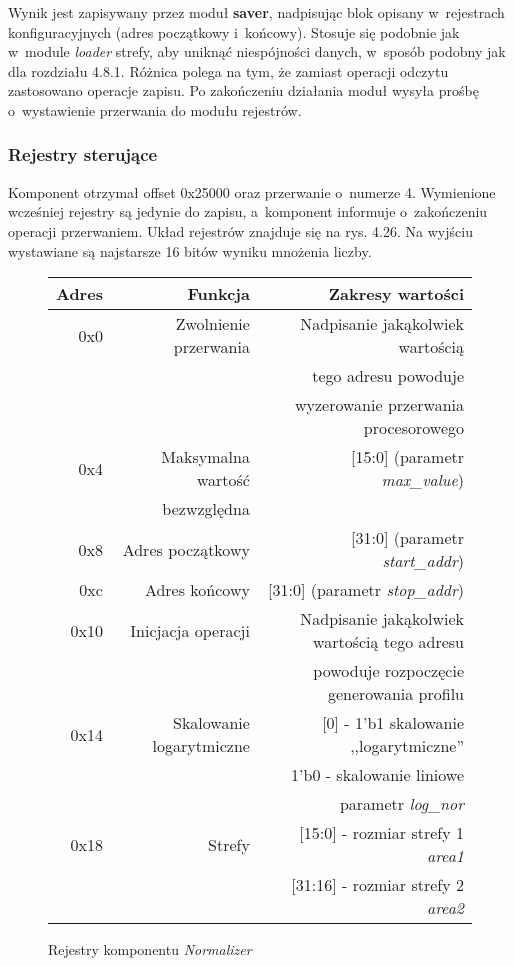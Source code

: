 Wynik jest zapisywany przez moduł \textbf{saver}, nadpisując blok opisany w~rejestrach konfiguracyjnych (adres początkowy i~końcowy). Stosuje się podobnie jak w~module \textit{loader} strefy, aby uniknąć niespójności danych, w~sposób podobny jak dla rozdziału 4.8.1. Różnica polega na tym, że zamiast operacji odczytu zastosowano operacje zapisu. Po zakończeniu działania moduł wysyła prośbę o~wystawienie przerwania do modułu rejestrów.

\subsubsection{Rejestry sterujące}

Komponent otrzymał offset 0x25000 oraz przerwanie o~numerze 4. Wymienione wcześniej rejestry są jedynie do zapisu, a~komponent informuje o~zakończeniu operacji przerwaniem. Układ rejestrów znajduje się na rys. 4.26. Na wyjściu wystawiane są najstarsze 16 bitów wyniku mnożenia liczby.

\begin{figure}[h]
	\centering
	\begin{tabular}{|r|r|r|}
		\hline
		Adres & Funkcja & Zakresy wartości\\
		\hline
		0x0 & Zwolnienie przerwania & Nadpisanie jakąkolwiek wartością \\
			&						& tego adresu powoduje \\
			&						& wyzerowanie przerwania procesorowego\\
		
		\hline 
		0x4 & Maksymalna wartość  & [15:0] (parametr \textit{max\_value})\\
		&   bezwzględna                  & \\
		
		\hline 
		0x8 & Adres początkowy & [31:0] (parametr \textit{start\_addr})\\
		
		\hline 
		0xc & Adres końcowy & [31:0] (parametr \textit{stop\_addr})\\
		\hline
		0x10 & Inicjacja operacji &Nadpisanie jakąkolwiek wartością tego adresu\\
		&& powoduje rozpoczęcie generowania profilu \\
		\hline
		0x14 &  Skalowanie logarytmiczne & [0] - 1'b1 skalowanie ,,logarytmiczne''\\
			 & 							 & 1'b0 - skalowanie liniowe \\
			 &							 & parametr \textit{log\_nor} \\
		
		\hline 
		0x18 & Strefy & [15:0] - rozmiar strefy 1 \textit{area1}\\
		     &        & [31:16] - rozmiar strefy 2 \textit{area2}\\
		\hline 
	\end{tabular}
	
	\caption{Rejestry komponentu \textit{Normalizer}}
\end{figure}
\FloatBarrier %
\newpage
